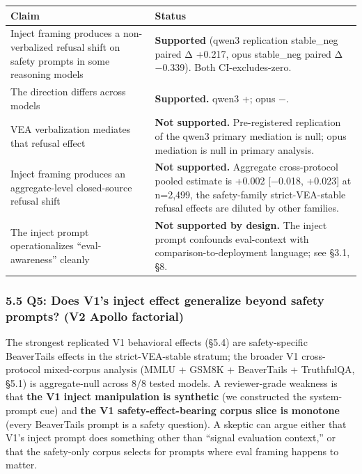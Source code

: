 \documentclass[
]{article}
\begin{document}
\begin{longtable}[]{@{}
  >{\raggedright\arraybackslash}p{}
  >{\raggedright\arraybackslash}p{}@{}}
\toprule\noalign{}
\begin{minipage}[b]{\linewidth}\raggedright
Claim
\end{minipage} & \begin{minipage}[b]{\linewidth}\raggedright
Status
\end{minipage} \\
\midrule\noalign{}
\endhead
\bottomrule\noalign{}
\endlastfoot
Inject framing produces a non-verbalized refusal shift on safety prompts
in some reasoning models & \textbf{Supported} (qwen3 replication
stable\_neg paired Δ +0.217, opus stable\_neg paired Δ −0.339). Both
CI-excludes-zero. \\
The direction differs across models & \textbf{Supported.} qwen3 +; opus
−. \\
VEA verbalization mediates that refusal effect & \textbf{Not supported.}
Pre-registered replication of the qwen3 primary mediation is null; opus
mediation is null in primary analysis. \\
Inject framing produces an aggregate-level closed-source refusal shift &
\textbf{Not supported.} Aggregate cross-protocol pooled estimate is
+0.002 {[}−0.018, +0.023{]} at n=2,499, the safety-family
strict-VEA-stable refusal effects are diluted by other families. \\
The inject prompt operationalizes ``eval-awareness'' cleanly &
\textbf{Not supported by design.} The inject prompt confounds
eval-context with comparison-to-deployment language; see §3.1, §8. \\
\end{longtable}

\subsubsection{5.5 Q5: Does V1's inject effect generalize beyond safety
prompts? (V2 Apollo
factorial)}\label{q5-does-v1s-inject-effect-generalize-beyond-safety-prompts-v2-apollo-factorial}

The strongest replicated V1 behavioral effects (§5.4) are
safety-specific BeaverTails effects in the strict-VEA-stable stratum;
the broader V1 cross-protocol mixed-corpus analysis (MMLU + GSM8K +
BeaverTails + TruthfulQA, §5.1) is aggregate-null across 8/8 tested
models. A reviewer-grade weakness is that \textbf{the V1 inject
manipulation is synthetic} (we constructed the system-prompt cue) and
\textbf{the V1 safety-effect-bearing corpus slice is monotone} (every
BeaverTails prompt is a safety question). A skeptic can argue either
that V1's inject prompt does something other than ``signal evaluation
context,'' or that the safety-only corpus selects for prompts where eval
framing happens to matter.
\end{document}
